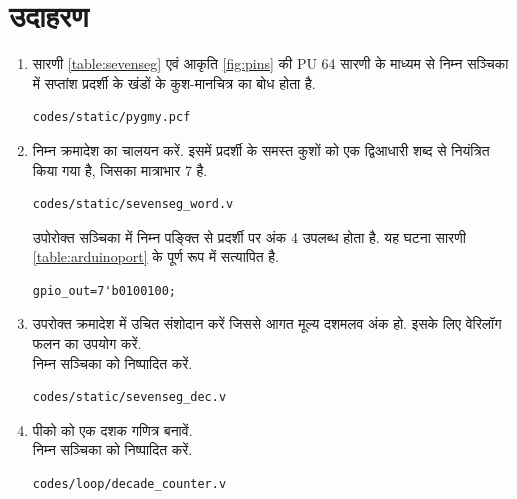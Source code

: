 \documentclass[journal,12pt,twocolumn]{IEEEtran}
\renewcommand\thesection{\arabic{section}}
\begin{document}
\section{उदाहरण}
\renewcommand{\theequation}{\theenumi}
\renewcommand{\thefigure}{\theenumi}
\begin{enumerate}[label=\thesection.\arabic*.,ref=\thesection.\theenumi]



\item  सारणी \ref{table:sevenseg} एवं 
आकृति \ref{fig:pins}  की PU 64 सारणी के माध्यम से निम्न सञ्चिका में सप्तांश प्रदर्शी के खंडों के कुश-मानचित्र का बोध होता है.  
\begin{lstlisting}
codes/static/pygmy.pcf
\end{lstlisting}
\item निम्न क्रमादेश का चालयन करें.  इसमें प्रदर्शी के समस्त कुशों को एक द्विआधारी शब्द से नियंत्रित किया गया है, जिसका मात्राभार 7 है.
\begin{lstlisting}
codes/static/sevenseg_word.v
\end{lstlisting}
उपोरोक्त सञ्चिका में निम्न पङ्क्ति से प्रदर्शी पर अंक 4 उपलब्ध होता है.  यह घटना सारणी \ref{table:arduinoport}  के पूर्ण रूप में सत्यापित है. 
\begin{lstlisting}
gpio_out=7'b0100100;
\end{lstlisting}
\item उपरोक्त क्रमादेश में उचित संशोदान करें जिससे आगत मूल्य दशमलव अंक  हो. इसके लिए वेरिलॉग फलन का उपयोग करें.
\\
\solution  निम्न सञ्चिका को निष्पादित करें.
\begin{lstlisting}
codes/static/sevenseg_dec.v
\end{lstlisting}
\item  पीको  को एक दशक गणित्र बनावें.
\\
\solution निम्न सञ्चिका को निष्पादित करें.
\begin{lstlisting}
codes/loop/decade_counter.v
\end{lstlisting}
\end{enumerate}
%
\end{document}
